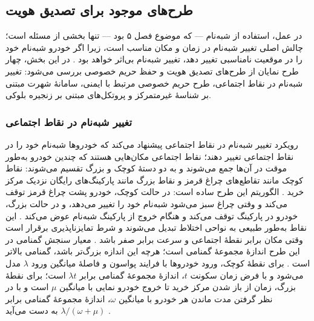 \subsection{طرح‌های موجود برای تصدیق هویت}

در عمل، استفاده از شبه‌نام — که موضوع فصل ۵ بود — تنها بخشی از مسئله است؛ چالش اصلی تغییر شبه‌نام در زمان و مکان مناسب است، زیرا اگر خودرو شبه‌نام خود را در موقعیت نامناسبی تغییر دهد، تغییر شبه‌نام بی‌اثر خواهد بود \cite{luPseudonymChangingSocial2012, al-aniPrivacySafetyImprovement2023, rahmawatiagustinaSystematicLiteratureReview2025}. در این بخش، چهار طرح نمایان از طرح‌های تصدیق هویت و حفظ حریم خصوصی بررسی می‌شود: تغییر شبه‌نام در نقاط اجتماعی، طرح حریم خصوصی مرتبط با ایمنی، سامانهٔ شهرت مبتنی بر شناسهٔ غیرمتمرکز و پروتکل‌های مبتنی بر زنجیره بلوکی.

\subsubsection{تغییر شبه‌نام در نقاط اجتماعی }

رویکرد تغییر شبه‌نام در نقاط اجتماعی  پیشنهاد می‌کند که خودروها شبه‌نام خود را در نقاط اجتماعی تغییر دهند؛ نقاط اجتماعی مکان‌هایی هستند که چندین خودرو به‌طور موقت در آن‌ها جمع می‌شوند و به دو دستهٔ کوچک و بزرگ تقسیم می‌شوند: نقاط کوچک مانند تقاطع‌های چراغ قرمز و نقاط بزرگ مانند پارکینگ‌های رایگان نزدیک مرکز خرید \cite{luPseudonymChangingSocial2012}. الگوریتم این طرح ساده است: در حالت کوچک، خودرو پشت چراغ قرمز توقف می‌کند و وقتی چراغ سبز می‌شود شبه‌نام خود را تغییر می‌دهد، و در حالت بزرگ، خودرو در پارکینگ توقف می‌کند و هنگام خروج از پارکینگ شبه‌نام عوض می‌کند \cite{luPseudonymChangingSocial2012}. این نقاط به‌طور طبیعی به نواحی اختلاط تبدیل می‌شوند و شرط تمایزناپذیری برقرار است وقتی مکان برابر نقطهٔ اجتماعی و سرعت برابر صفر باشد \cite{luPseudonymChangingSocial2012}. معیار سنجش گمنامی در این طرح اندازهٔ مجموعهٔ گمنامی است؛ هرچه این اندازه بزرگ‌تر باشد، گمنامی بالاتر است \cite{luPseudonymChangingSocial2012}. برای نقطهٔ کوچک، ورود خودروها با فرایند پواسون و فاصلهٔ میانگین ورود $\lambda$ مدل می‌شود و با فرض زمان سکونت $t$، اندازهٔ مجموعهٔ گمنامی برابر $\lambda t$ است؛ برای نقطهٔ بزرگ، زمان از باز شدن مرکز خرید تا خروج خودرو نمایی با میانگین $\mu$ است و با در نظر گرفتن مدت ماندن هر خودرو با میانگین $\omega$، اندازهٔ مجموعهٔ گمنامی برابر $\lambda/(\omega+\mu)$ به دست می‌آید \cite{luPseudonymChangingSocial2012}.

